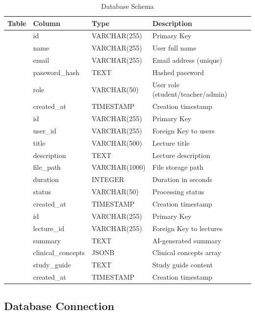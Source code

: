 \documentclass[12pt,a4paper]{article}
\begin{document}
\begin{table}[H]
\centering
\caption{Database Schema}
\label{tab:database-schema}
\scriptsize
\begin{tabular}{@{}>{\raggedright\arraybackslash}p{2.2cm}>{\raggedright\arraybackslash}p{2.8cm}>{\raggedright\arraybackslash}p{2.5cm}>{\raggedright\arraybackslash}p{6.0cm}@{}}
\toprule
\textbf{Table} & \textbf{Column} & \textbf{Type} & \textbf{Description} \\
\midrule
\multirow{6}{*}{users} & id & VARCHAR(255) & Primary Key \\
& name & VARCHAR(255) & User full name \\
& email & VARCHAR(255) & Email address (unique) \\
& password\_hash & TEXT & Hashed password \\
& role & VARCHAR(50) & User role (student/teacher/admin) \\
& created\_at & TIMESTAMP & Creation timestamp \\
\midrule
\multirow{7}{*}{lectures} & id & VARCHAR(255) & Primary Key \\
& user\_id & VARCHAR(255) & Foreign Key to users \\
& title & VARCHAR(500) & Lecture title \\
& description & TEXT & Lecture description \\
& file\_path & VARCHAR(1000) & File storage path \\
& duration & INTEGER & Duration in seconds \\
& status & VARCHAR(50) & Processing status \\
& created\_at & TIMESTAMP & Creation timestamp \\
\midrule
\multirow{5}{*}{lecture\_analyses} & id & VARCHAR(255) & Primary Key \\
& lecture\_id & VARCHAR(255) & Foreign Key to lectures \\
& summary & TEXT & AI-generated summary \\
& clinical\_concepts & JSONB & Clinical concepts array \\
& study\_guide & TEXT & Study guide content \\
& created\_at & TIMESTAMP & Creation timestamp \\
\bottomrule
\end{tabular}
\normalsize
\end{table}

\subsection{Database Connection}
\end{document}
